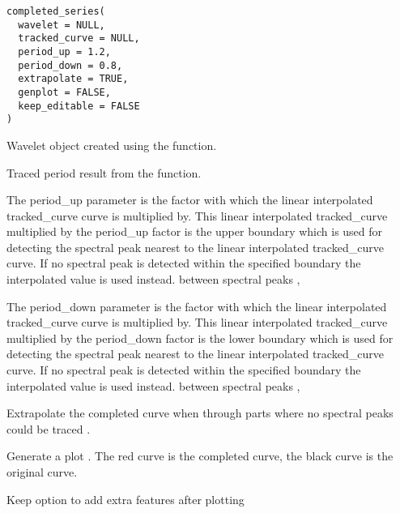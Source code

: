 \documentclass[a4paper]{book}
\begin{document}
%
\begin{Usage}
\begin{verbatim}
completed_series(
  wavelet = NULL,
  tracked_curve = NULL,
  period_up = 1.2,
  period_down = 0.8,
  extrapolate = TRUE,
  genplot = FALSE,
  keep_editable = FALSE
)
\end{verbatim}
\end{Usage}
%
\begin{Arguments}
\begin{ldescription}
\item[\code{wavelet}] Wavelet object created using the  function.

\item[\code{tracked\_curve}] Traced period result from the  function.

\item[\code{period\_up}] The period\_up parameter is the factor with which the linear interpolated tracked\_curve
curve is multiplied by. This linear interpolated tracked\_curve multiplied by the period\_up factor is
the upper boundary which is used  for detecting the spectral peak nearest to the linear interpolated tracked\_curve
curve. If no spectral peak is detected within the specified boundary the interpolated
value is used instead. between spectral peaks ,

\item[\code{period\_down}] The period\_down parameter is the factor with which the linear interpolated tracked\_curve
curve is multiplied by. This linear interpolated tracked\_curve multiplied by the period\_down factor is
the lower boundary which is used  for detecting the spectral peak nearest to the linear interpolated tracked\_curve
curve. If no spectral peak is detected within the specified boundary the interpolated
value is used instead. between spectral peaks ,

\item[\code{extrapolate}] Extrapolate the completed curve when through parts where no spectral peaks could be traced
.

\item[\code{genplot}] Generate a plot . The red curve is the completed curve,
the black curve is the original curve.

\item[\code{keep\_editable}] Keep option to add extra features after plotting  
\end{ldescription}
\end{Arguments}
\end{document}

